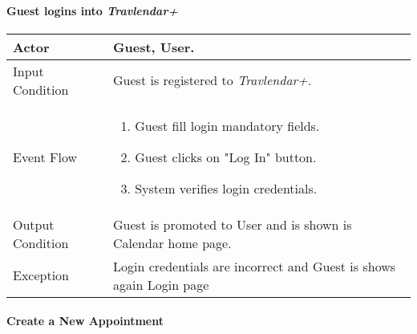 	\paragraph{Guest logins into \textit{Travlendar+}} \label{login_useCase}
	
		\begin{tabular}{| l | p{} | }
			\hline
			\hline
			Actor	&		Guest, User. \\
			\hline
			Input Condition		&		Guest is registered to  \textit{Travlendar+}. \\
			\hline
			Event Flow		&		\begin{enumerate}
												\item Guest fill login mandatory fields.
												\item Guest clicks on "Log In" button.
												\item System verifies login credentials.
											\end{enumerate} \\
			\hline
			Output Condition		&		Guest is promoted to User and is shown is Calendar home page. \\
			\hline		
			Exception		&		Login credentials are incorrect and Guest is shows again Login page\\
			\hline
			\hline
		\end{tabular}

	\paragraph{Create a New Appointment} \label{createEvent_useCase}
	
